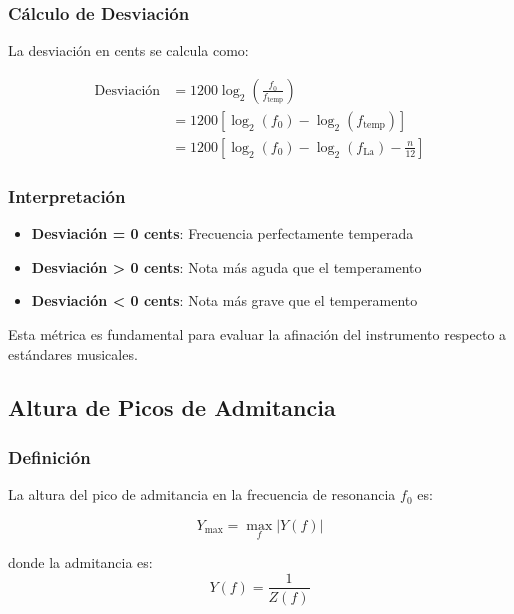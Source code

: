 \documentclass[12pt,a4paper,twocolumn]{article}
\newcommand{\impedance}{Z}
\newcommand{\admittance}{Y}
\newcommand{\freq}{f}
\newcommand{\freqzero}{f_0}
\begin{document}
\subsubsection{Cálculo de Desviación}

La desviación en cents se calcula como:

\begin{align}
\text{Desviación} &= 1200 \log_2\left(\frac{\freqzero}{\freq_{\text{temp}}}\right) \\
&= 1200 \left[\log_2(\freqzero) - \log_2(\freq_{\text{temp}})\right] \\
&= 1200 \left[\log_2(\freqzero) - \log_2(\freq_{\text{La}}) - \frac{n}{12}\right]
\label{eq:desviacion_deriv}
\end{align}

\subsubsection{Interpretación}

\begin{itemize}
    \item \textbf{Desviación = 0 cents}: Frecuencia perfectamente temperada
    \item \textbf{Desviación > 0 cents}: Nota más aguda que el temperamento
    \item \textbf{Desviación < 0 cents}: Nota más grave que el temperamento
\end{itemize}

Esta métrica es fundamental para evaluar la afinación del instrumento respecto a estándares musicales.

\subsection{Altura de Picos de Admitancia}

\subsubsection{Definición}

La altura del pico de admitancia en la frecuencia de resonancia $\freqzero$ es:

\begin{equation}
\admittance_{\max} = \max_f |\admittance(f)|
\label{eq:admittance_peak}
\end{equation}

donde la admitancia es:
\begin{equation}
\admittance(f) = \frac{1}{\impedance(f)}
\label{eq:admittance_def}
\end{equation}
\end{document}

